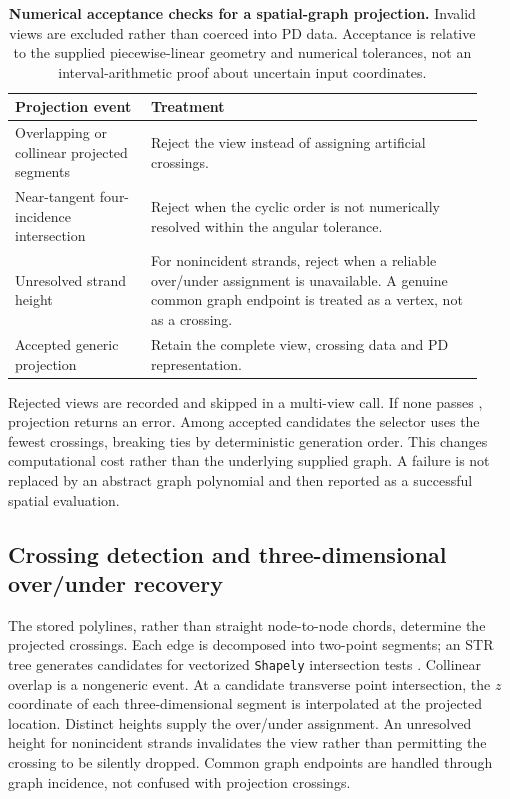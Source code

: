 \begin{table}[!t]
\centering\small
\begin{tabular}{p{0.27\linewidth}p{0.66\linewidth}}
\hline
\textbf{Projection event} & \textbf{Treatment}\\\hline
Overlapping or collinear projected segments & Reject the view instead of assigning artificial crossings.\\[0.35em]
Near-tangent four-incidence intersection & Reject when the cyclic order is not numerically resolved within the angular tolerance.\\[0.35em]
Unresolved strand height & For nonincident strands, reject when a reliable over/under assignment is unavailable. A genuine common graph endpoint is treated as a vertex, not as a crossing.\\[0.35em]
Accepted generic projection & Retain the complete view, crossing data and PD representation.\\\hline
\end{tabular}
\caption{\textbf{Numerical acceptance checks for a spatial-graph projection.} Invalid views are excluded rather than coerced into PD data. Acceptance is relative to the supplied piecewise-linear geometry and numerical tolerances, not an interval-arithmetic proof about uncertain input coordinates.}
\label{supptab:projection_acceptance}
\end{table}

Rejected views are recorded and skipped in a multi-view call. If none passes , projection returns an error. Among accepted candidates the selector uses the fewest crossings, breaking ties by deterministic generation order. This changes computational cost rather than the underlying supplied graph. A failure is not replaced by an abstract graph polynomial and then reported as a successful spatial evaluation.

\subsection{Crossing detection and three-dimensional over/under recovery}
\label{supp:projection_crossings}
The stored polylines, rather than straight node-to-node chords, determine the projected crossings. Each edge is decomposed into two-point segments; an STR tree generates candidates for vectorized \texttt{Shapely} intersection tests \cite{kg_shapely,kg_leutenegger1997str}. Collinear overlap is a nongeneric event. At a candidate transverse point intersection, the $z$ coordinate of each three-dimensional segment is interpolated at the projected location. Distinct heights supply the over/under assignment. An unresolved height for nonincident strands invalidates the view rather than permitting the crossing to be silently dropped. Common graph endpoints are handled through graph incidence, not confused with projection crossings.


